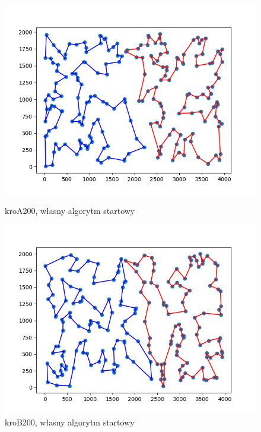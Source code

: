 \documentclass[11pt]{article}
\begin{document}
\begin{figure}[H]
    \vspace{0.5cm}

    \begin{minipage}[t]{0.45\textwidth}
        \centering
        \includegraphics[width=\linewidth]{best_paths/kroA200/traverse_random/split_paths_regret_TSP}
        \caption{kroA200, własny algorytm startowy}
    \end{minipage}
    \hfill
    \begin{minipage}[t]{0.45\textwidth}
        \centering
        \includegraphics[width=\linewidth]{best_paths/kroB200/traverse_random/split_paths_regret_TSP}
        \caption{kroB200, własny algorytm startowy}
    \end{minipage}
    \label{fig:minipage-random}
\end{figure}
\end{document}
